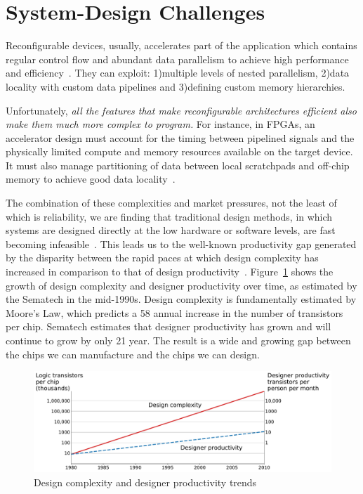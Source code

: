 \section{System-Design Challenges}


Reconfigurable devices, usually, accelerates part of the application which contains regular control flow and abundant data parallelism to achieve high performance and efficiency~\cite{spatial_computation, trips, govindaraju_hpca_2011}.
They can exploit: 1)multiple levels of nested parallelism, 2)data locality with custom data pipelines and 3)defining custom memory hierarchies.

Unfortunately, \textit{all the features that make reconfigurable architectures efficient also make them much more complex to program.}
For instance, in FPGAs, an accelerator design must account for the timing between pipelined signals and the physically limited compute and memory resources available on the target device.
It must also manage partitioning of data between local scratchpads and off-chip memory to achieve good data locality~\cite{gzip_2013_fpga}.


The combination of these complexities and market pressures, not the least
of which is reliability, we are finding that traditional design methods, in which
systems are designed directly at the low hardware or software levels, are fast
becoming infeasible~\cite{cascaval_taxonomy_accelerator}. This leads us to the well-known productivity gap generated by the disparity between the rapid paces at which design complexity has increased in comparison to that of design productivity~\cite{itrs}.
Figure~\ref{fig:productivity} shows the growth of design complexity and designer productivity
over time, as estimated by the Sematech in the mid-1990s. Design complexity
is fundamentally estimated by Moore’s Law, which predicts a 58%
annual increase in the number of transistors per chip. Sematech estimates that
designer productivity has grown and will continue to grow by only 21%
year. The result is a wide and growing gap between the chips we can manufacture
and the chips we can design. 

\begin{figure}[h]
    \centering
    \includegraphics[width=\textwidth]{plots/productivity.pdf}
    \caption{Design complexity and designer productivity trends}
    \label{fig:productivity}
\end{figure}


